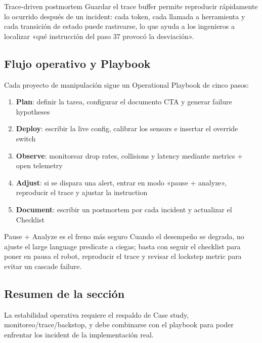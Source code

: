 \begin{knowledgebox}{Trace-driven postmortem}
Guardar el trace buffer permite reproducir rápidamente lo ocurrido después de un incident: cada token, cada llamada a herramienta y cada transición de estado puede rastrearse, lo que ayuda a los ingenieros a localizar «qué instrucción del paso 37 provocó la desviación».
\end{knowledgebox}

\subsection{Flujo operativo y Playbook}

Cada proyecto de manipulación sigue un Operational Playbook de cinco pasos:

\begin{enumerate}
    \item \textbf{Plan}: definir la tarea, configurar el documento CTA y generar failure hypotheses
    \item \textbf{Deploy}: escribir la live config, calibrar los sensors e insertar el override switch
    \item \textbf{Observe}: monitorear drop rates, collisions y latency mediante metrics + open telemetry
    \item \textbf{Adjust}: si se dispara una alert, entrar en modo «pause + analyze», reproducir el trace y ajustar la instruction
    \item \textbf{Document}: escribir un postmortem por cada incident y actualizar el Checklist
\end{enumerate}

\begin{warningbox}{Pause + Analyze es el freno más seguro}
Cuando el desempeño se degrada, no ajuste el large language predicate a ciegas; basta con seguir el checklist para poner en pausa el robot, reproducir el trace y revisar el lockstep metric para evitar un cascade failure.
\end{warningbox}

\subsection{Resumen de la sección}

La estabilidad operativa requiere el respaldo de Case study, monitoreo/trace/backstop, y debe combinarse con el playbook para poder enfrentar los incident de la implementación real.

\newpage

